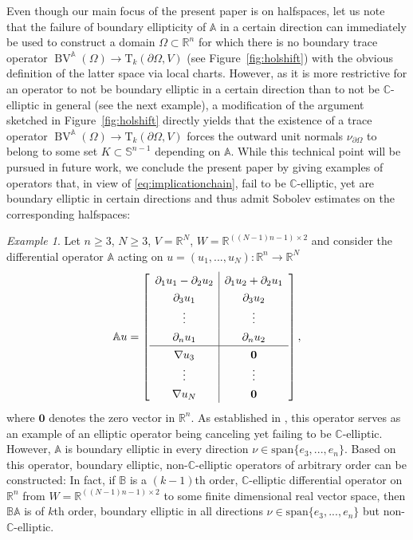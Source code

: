 \documentclass[a4paper,10pt]{amsart}
\newcommand{\R}{\mathbb R}
\newcommand{\bv}{\operatorname{BV}}
\newcommand{\A}{\mathbb{A}}
\numberwithin{equation}{section}
\theoremstyle{remark}
\newtheorem{example}[theorem]{Example}
\numberwithin{equation}{section}
\begin{document}
	Even though our main focus of the present paper is on halfspaces, let us note that the failure of boundary ellipticity of $\A$ in a certain direction can immediately be used to construct a domain $\Omega\subset\R^{n}$ for which there is no boundary trace operator $\bv^{\A}(\Omega)\to\mathrm{T}_{k}(\partial\Omega,V)$ (see Figure~\ref{fig:holshift}) with the obvious definition of the latter space via local charts. However, as it is more restrictive for an operator to not be boundary elliptic in a certain direction than to not be $\mathbb{C}$-elliptic in general (see the next example), a modification of the argument sketched in Figure~\ref{fig:holshift} directly yields that the existence of a trace operator $\bv^{\A}(\Omega)\to\mathrm{T}_{k}(\partial\Omega,V)$ forces the outward unit normals $\nu_{\partial\Omega}$ to belong to some set $K\subset\mathbb{S}^{n-1}$ depending on $\A$. While this technical point will be pursued in future work, we conclude the present paper by giving examples of operators that, in view of \eqref{eq:implicationchain}, fail to be $\mathbb{C}$-elliptic, yet are boundary elliptic in certain directions and thus admit Sobolev estimates on the corresponding halfspaces:
	\begin{example} 
		Let $n\geq 3$, $N\geq 3$, $V=\R^{N}$, $W=\R^{((N-1)n-1)\times 2}$ and consider the differential operator $\A$ acting on $u=(u_{1},...,u_{N})\colon\R^{n}\to\R^{N}$
		\begin{align}\label{eq:directional}
			\renewcommand\arraystretch{1.3}
			\A u = \left[
			\begin{array}{c|c}
				\partial_{1}u_{1}-\partial_{2}u_{2}  & \partial_{1}u_{2}+\partial_{2}u_{1} \\
				\partial_{3} u_{1} & \partial_{3}u_{2} \\ \vdots & \vdots \\ \partial_{n}u_{1} & \partial_{n}u_{2} \\
				\hline
				\nabla u_{3} & \mathbf{0} \\ \vdots & \vdots \\ \nabla u_{N} & \mathbf{0} 
			\end{array}
			\right], 
		\end{align}
		where $\mathbf{0}$ denotes the zero vector in $\R^{n}$. As established in \cite[Counterexample 3.4]{GR}, this operator serves as an example of an elliptic operator being canceling yet failing to be $\mathbb{C}$-elliptic. However, $\A$ is boundary elliptic in every direction $\nu\in\text{span}\{e_{3},...,e_{n}\}$. Based on this operator, boundary elliptic, non-$\mathbb{C}$-elliptic operators of arbitrary order can be constructed: In fact, if $\mathbb{B}$ is a $(k-1)$th order, $\mathbb{C}$-elliptic differential operator on $\R^{n}$ from $W=\R^{((N-1)n-1)\times 2}$ to some finite dimensional real vector space, then $\mathbb{B}\A$ is of $k$th order, boundary elliptic in all directions $\nu\in\mathrm{span}\{e_{3},...,e_{n}\}$ but non-$\mathbb{C}$-elliptic. 
	\end{example} 
	
\end{document}
